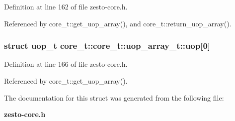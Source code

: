 Definition at line 162 of file zesto-core.h.

Referenced by core\_\-t::get\_\-uop\_\-array(), and core\_\-t::return\_\-uop\_\-array().
\subsubsection[{uop}]{\setlength{\rightskip}{0pt plus 5cm}struct {\bf uop\_\-t} core\_\-t::core\_\-t::uop\_\-array\_\-t::uop[0]\hspace{0.3cm}{\tt  [read]}}\label{structcore__t_1_1uop__array__t_e8f855054b1addeacf882c94192a38ab}




Definition at line 166 of file zesto-core.h.

Referenced by core\_\-t::get\_\-uop\_\-array().

The documentation for this struct was generated from the following file:\begin{CompactItemize}
\item 
{\bf zesto-core.h}\end{CompactItemize}
